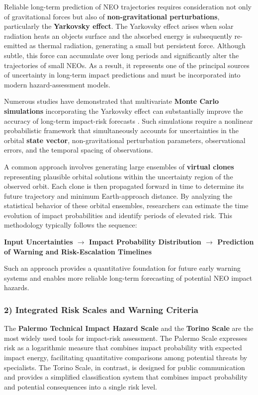 Reliable long-term prediction of NEO trajectories requires consideration not only of gravitational forces but also of \textbf{non-gravitational perturbations}, particularly the \textbf{Yarkovsky effect}. The Yarkovsky effect arises when solar radiation heats an object\textquotesingle s surface and the absorbed energy is subsequently re-emitted as thermal radiation, generating a small but persistent force. Although subtle, this force can accumulate over long periods and significantly alter the trajectories of small NEOs. As a result, it represents one of the principal sources of uncertainty in long-term impact predictions and must be incorporated into modern hazard-assessment models.

Numerous studies have demonstrated that multivariate \textbf{Monte Carlo simulations} incorporating the Yarkovsky effect can substantially improve the accuracy of long-term impact-risk forecasts \cite{vokrouhlicky2015}. Such simulations require a nonlinear probabilistic framework that simultaneously accounts for uncertainties in the orbital \textbf{state vector}, non-gravitational perturbation parameters, observational errors, and the temporal spacing of observations.

A common approach involves generating large ensembles of \textbf{virtual clones} representing plausible orbital solutions within the uncertainty region of the observed orbit. Each clone is then propagated forward in time to determine its future trajectory and minimum Earth-approach distance. By analyzing the statistical behavior of these orbital ensembles, researchers can estimate the time evolution of impact probabilities and identify periods of elevated risk. This methodology typically follows the sequence:

\textbf{Input Uncertainties $\rightarrow$ Impact Probability Distribution $\rightarrow$ Prediction of Warning and Risk-Escalation Timelines}

Such an approach provides a quantitative foundation for future early warning systems and enables more reliable long-term forecasting of potential NEO impact hazards.

\subsubsection{2) Integrated Risk Scales and Warning Criteria}\label{integrated-risk-scales-and-warning-criteria}

The \textbf{Palermo Technical Impact Hazard Scale} and the \textbf{Torino Scale} are the most widely used tools for impact-risk assessment. The Palermo Scale expresses risk as a logarithmic measure that combines impact probability with expected impact energy, facilitating quantitative comparisons among potential threats by specialists. The Torino Scale, in contrast, is designed for public communication and provides a simplified classification system that combines impact probability and potential consequences into a single risk level.

